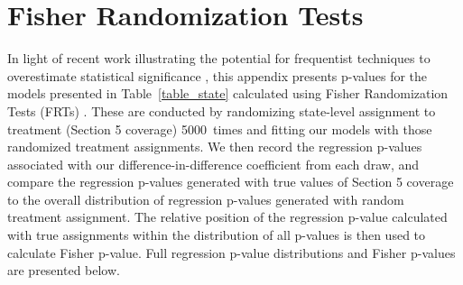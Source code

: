 \documentclass[12pt]{article}
\begin{document}

\section{Fisher Randomization Tests}\label{appendix_fisher}
\setcounter{table}{0}
\setcounter{figure}{0}
\renewcommand{\thetable}{J\arabic{table}}
\renewcommand{\thefigure}{J\arabic{figure}}
\normalsize

\newcommand{\fisherN}{5000}

In light of recent work illustrating the potential for frequentist techniques to overestimate statistical significance , this appendix presents p-values for the models presented in Table~\ref{table_state} calculated using Fisher Randomization Tests (FRTs) .  These are conducted by randomizing state-level assignment to treatment (Section 5 coverage) \fisherN\ times and fitting our models with those randomized treatment assignments. We then record the regression p-values associated with our difference-in-difference coefficient from each draw, and compare the regression p-values generated with true values of Section 5 coverage to the overall distribution of regression p-values generated with random treatment assignment. The relative position of the regression p-value calculated with true assignments within the distribution of all p-values is then used to calculate Fisher p-value. Full regression p-value distributions and Fisher p-values are presented below.
\end{document}
